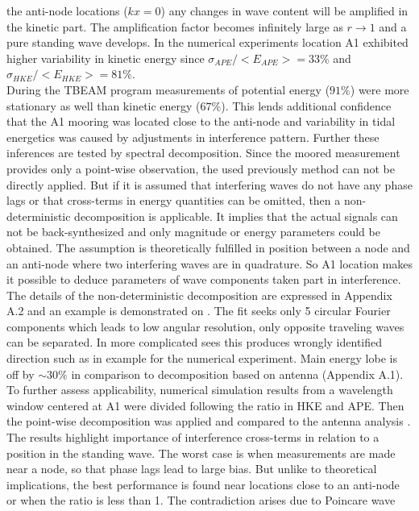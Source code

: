 \documentclass[12pt]{article}
\begin{document}
the anti-node locations ($kx = 0$) any changes in wave content will be amplified in the kinetic 
part. The amplification factor becomes infinitely large as $r \rightarrow 1$ and a pure standing 
wave develops. In the numerical experiments location A1 exhibited higher variability in kinetic 
energy since $\sigma_{APE}/<E_{APE}> = 33\%$ and $\sigma_{HKE}/<E_{HKE}> = 81\%$.\\
During the TBEAM program measurements of potential energy ($91\%$) were more stationary as well 
than kinetic energy ($67\%$). This lends additional confidence that the A1 mooring was located 
close to the anti-node and variability in tidal energetics was caused by adjustments in 
interference pattern. Further these inferences are tested by spectral decomposition. Since the 
moored measurement provides only a point-wise observation, the used previously method can 
not be directly applied. But if it is assumed that interfering waves do not have any phase lags or 
that cross-terms in energy quantities can be omitted, then a non-deterministic decomposition is 
applicable. It implies that the actual signals can not be back-synthesized and only magnitude or 
energy parameters could be obtained. The assumption is theoretically fulfilled in position between 
a node and an anti-node where two interfering waves are in quadrature. So A1 location makes it 
possible to deduce parameters of wave components taken part in interference.\\
The details of the non-deterministic decomposition are expressed in Appendix A.2 and an example 
is demonstrated on . The fit seeks only 5 circular Fourier components 
which leads to low angular resolution, only opposite traveling waves can be separated. In more 
complicated sees this produces wrongly identified direction such as in example for the numerical 
experiment. Main energy lobe is off by $\sim 30 \%$ in comparison to decomposition based on antenna 
(Appendix A.1). To further assess applicability, numerical simulation results from a wavelength 
window centered at A1 were divided following the ratio in HKE and APE. Then the point-wise 
decomposition was applied and compared to the antenna analysis . The 
results highlight importance of interference cross-terms in relation to a position in the standing 
wave. The worst case is when measurements are made near a node, so that phase lags lead to large 
bias. But unlike to theoretical implications, the best performance is found near locations close to 
an anti-node or when the ratio is less than 1. The contradiction arises due to Poincare wave 
\end{document}

